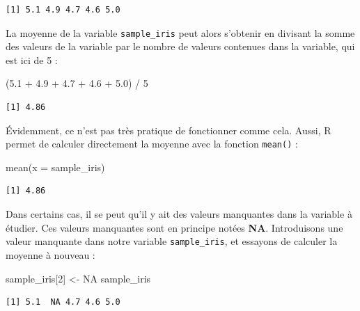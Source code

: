 \documentclass[
  letterpaper,
]{book}
\newenvironment{Shaded}{\begin{snugshade}}{\end{snugshade}}
\newcommand{\AttributeTok}[1]{\textcolor[rgb]{0.40,0.45,0.13}{#1}}
\newcommand{\ConstantTok}[1]{\textcolor[rgb]{0.56,0.35,0.01}{#1}}
\newcommand{\DecValTok}[1]{\textcolor[rgb]{0.68,0.00,0.00}{#1}}
\newcommand{\FloatTok}[1]{\textcolor[rgb]{0.68,0.00,0.00}{#1}}
\newcommand{\FunctionTok}[1]{\textcolor[rgb]{0.28,0.35,0.67}{#1}}
\newcommand{\NormalTok}[1]{\textcolor[rgb]{0.00,0.23,0.31}{#1}}
\newcommand{\OtherTok}[1]{\textcolor[rgb]{0.00,0.23,0.31}{#1}}
\newcommand{\SpecialCharTok}[1]{\textcolor[rgb]{0.37,0.37,0.37}{#1}}
\begin{document}
\begin{verbatim}
[1] 5.1 4.9 4.7 4.6 5.0
\end{verbatim}

La moyenne de la variable \texttt{sample\_iris} peut alors s'obtenir en
divisant la somme des valeurs de la variable par le nombre de valeurs
contenues dans la variable, qui est ici de 5 :

\begin{Shaded}
\begin{Highlighting}[]
\NormalTok{(}\FloatTok{5.1} \SpecialCharTok{+} \FloatTok{4.9} \SpecialCharTok{+} \FloatTok{4.7} \SpecialCharTok{+} \FloatTok{4.6} \SpecialCharTok{+} \FloatTok{5.0}\NormalTok{) }\SpecialCharTok{/} \DecValTok{5}
\end{Highlighting}
\end{Shaded}

\begin{verbatim}
[1] 4.86
\end{verbatim}

Évidemment, ce n'est pas très pratique de fonctionner comme cela. Aussi,
R permet de calculer directement la moyenne avec la fonction
\texttt{mean()} :

\begin{Shaded}
\begin{Highlighting}[]
\FunctionTok{mean}\NormalTok{(}\AttributeTok{x =}\NormalTok{ sample\_iris)}
\end{Highlighting}
\end{Shaded}

\begin{verbatim}
[1] 4.86
\end{verbatim}

Dans certains cas, il se peut qu'il y ait des valeurs manquantes dans la
variable à étudier. Ces valeurs manquantes sont en principe notées
\textbf{NA}. Introduisons une valeur manquante dans notre variable
\texttt{sample\_iris}, et essayons de calculer la moyenne à nouveau :

\begin{Shaded}
\begin{Highlighting}[]
\NormalTok{sample\_iris[}\DecValTok{2}\NormalTok{] }\OtherTok{\textless{}{-}} \ConstantTok{NA}
\NormalTok{sample\_iris}
\end{Highlighting}
\end{Shaded}

\begin{verbatim}
[1] 5.1  NA 4.7 4.6 5.0
\end{verbatim}
\end{document}
